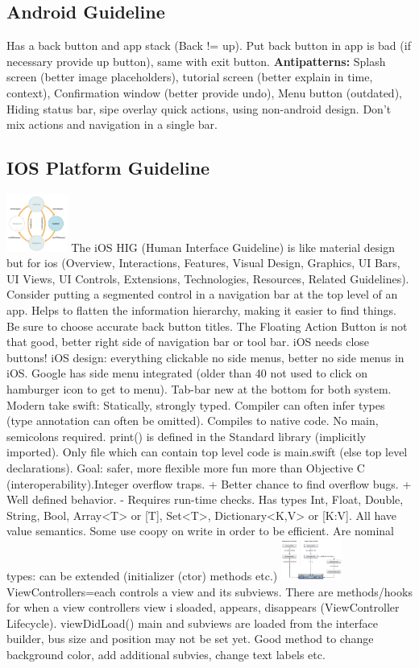 \subsection{Android Guideline}
Has a back button and app stack (Back != up).
Put back button in app is bad (if necessary provide up button), same with exit button.
\textbf{Antipatterns:} Splash screen (better image placeholders), tutorial screen (better explain in time, context), Confirmation window (better provide undo), Menu button (outdated), Hiding status bar, sipe overlay quick actions, using non-android design. Don't mix actions and navigation in a single bar.

\subsection{IOS Platform Guideline}
\includegraphics[width=0.15\textwidth]{ioslife.png}
The iOS HIG (Human Interface Guideline) is like material design but for ios (Overview, Interactions, Features, Visual Design, Graphics, UI Bars, UI Views, UI Controls, Extensions, Technologies, Resources, Related Guidelines). Consider putting a segmented control in a navigation bar at the top level of an app. Helps to flatten the information hierarchy, making it easier to find things. Be sure to choose accurate back button titles. The Floating Action Button is not that good, better right side of navigation bar or tool bar. iOS needs close buttons! iOS design: everything clickable no side menus, better no side menus in iOS. Google has side menu integrated (older than 40 not used to click on hamburger icon to get to menu). Tab-bar new at the bottom for both system.
Modern take swift: Statically, strongly typed. Compiler can often infer types (type annotation can often be omitted). Compiles to native code. No main, semicolons required. print() is defined in the Standard library (implicitly imported). Only file which can contain top level code is main.swift (else top level declarations). Goal: safer, more flexible more fun more than Objective C (interoperability).Integer overflow traps. + Better chance to find overflow bugs. + Well defined behavior. - Requires run-time checks. Has types Int, Float, Double, String, Bool, Array<T> or [T], Set<T>, Dictionary<K,V> or [K:V]. All have value semantics. Some use coopy on write in order to be efficient. Are nominal types: can be extended (initializer (ctor) methods etc.) 
\includegraphics[width=0.15\textwidth]{navigationbar.png}
ViewControllers=each controls a view and its subviews. There are methods/hooks for when a view controllers view i sloaded, appears, disappears (ViewController Lifecycle). viewDidLoad() main and subviews are loaded from the interface builder, bus size and position may not be set yet. Good method to change background color, add additional subvies, change text labels etc.

